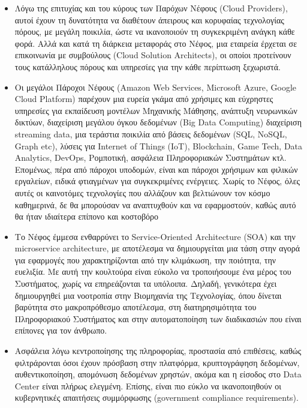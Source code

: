 \documentclass{article}
\begin{document}
\begin{itemize}
\item        Λόγω της επιτυχίας και του κύρους των Παρόχων Νέφους
(Cloud Providers), αυτοί
έχουν τη δυνατότητα να διαθέτουν άπειρους και κορυφαίας τεχνολογίας
πόρους, με μεγάλη ποικιλία, ώστε να ικανοποιούν τη συγκεκριμένη ανάγκη
κάθε φορά. Αλλά και κατά τη διάρκεια μεταφοράς στο Νέφος, μια εταιρεία
έρχεται σε επικοινωνία με συμβούλους (Cloud
Solution Architects), οι οποίοι προτείνουν τους
κατάλληλους πόρους και υπηρεσίες για την κάθε περίπτωση ξεχωριστά.

\item        Οι μεγάλοι Πάροχοι Νέφους (Amazon Web
Services, Microsoft Azure, Google Cloud Platform)
παρέχουν μια ευρεία γκάμα από χρήσιμες και εύχρηστες
υπηρεσίες για εκπαίδευση μοντέλων Μηχανικής Μάθησης, ανάπτυξη νευρωνικών
δικτύων, διαχείριση μεγάλου όγκου δεδομένων (Big
Data Computing) διαχείριση streaming data, μια
τεράστια ποικιλία από βάσεις δεδομένων (SQL,
NoSQL, Graph etc), λύσεις
για Internet of Things (IoT), Blockchain, Game
Tech, Data Analytics, DevOps, Ρομποτική, ασφάλεια
Πληροφοριακών Συστημάτων κτλ. Επομένως, πέρα από πάροχοι υποδομών, είναι
και πάροχοι χρήσιμων και φιλικών εργαλείων, ειδικά φτιαγμένων για
συγκεκριμένες ενέργειες. Χωρίς το Νέφος, όλες αυτές οι καινοτόμες
τεχνολογίες που αλλάζουν και βελτιώνουν τον κόσμο καθημερινά, δε θα
μπορούσαν να αναπτυχθούν και να εφαρμοστούν, καθώς αυτό θα ήταν ιδιαίτερα
επίπονο και κοστοβόρο

\item        Το Νέφος έμμεσα ενθαρρύνει το
Service-Oriented Architecture (SOA)
και την microservice
architecture, με αποτέλεσμα να δημιουργείται μια
τάση στην αγορά για εφαρμογές που χαρακτηρίζονται από την κλιμάκωση, την
ποιότητα, την ευελιξία. Με αυτή την κουλτούρα είναι εύκολο να τροποιήσουμε
ένα μέρος του Συστήματος, χωρίς να επηρεάζονται τα υπόλοιπα. Δηλαδή,
γενικότερα έχει δημιουργηθεί μια νοοτροπία στην Βιομηχανία της
Τεχνολογίας, όπου δίνεται βαρύτητα στο μακροπρόθεσμο αποτέλεσμα, στη
διατηρησιμότητα του Πληροφοριακού Συστήματος και στην αυτοματοποίηση των
διαδικασιών που είναι επίπονες για τον άνθρωπο.

\item        Ασφάλεια λόγω κεντροποίησης της πληροφορίας, προστασία από
επιθέσεις, καθώς φιλτράρονται όσοι έχουν πρόσβαση στην πλατφόρμα,
κρυπτογράφηση δεδομένων, αυθεντικοποίηση, απομόνωση δεδομένων χρηστών,
ακόμα και η είσοδος στο Data
Center είναι πλήρως ελεγμένη. Επίσης, είναι πιο
εύκλο να ικανοποιηθούν οι κυβερνητικές απαιτήσεις συμμόρφωσης
(government compliance
requirements).


\end{itemize}
\end{document}
